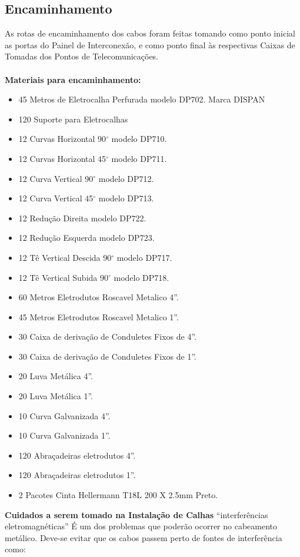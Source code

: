 \documentclass[	DIV=calc,%
							paper=a4,%
							fontsize=12pt,%
							onecolumn]{scrartcl}	 					%
\begin{document}
\subsection{Encaminhamento}
As rotas de encaminhamento dos cabos foram feitas tomando como ponto inicial as portas do Painel de Interconexão, e como ponto final às respectivas Caixas de Tomadas dos Pontos de Telecomunicações.
\\
\\
\textbf{Materiais para encaminhamento:} 
\begin{itemize}	
	\item 45 Metros de Eletrocalha Perfurada modelo DP702. Marca DISPAN
	\item 120 Suporte para Eletrocalhas
	\item 12 Curvas Horizontal 90$^\circ$ modelo DP710.
	\item 12 Curvas Horizontal 45$^\circ$  modelo DP711.
	\item 12 Curva Vertical 90$^\circ$ modelo DP712.
	\item 12 Curva Vertical 45$^\circ$  modelo DP713.
	\item 12 Redução Direita modelo DP722.
	\item 12 Redução Esquerda modelo DP723.
	\item 12 Tê Vertical Descida 90$^\circ$ modelo DP717.
	\item 12 Tê Vertical Subida 90$^\circ$ modelo DP718.
	\item 60 Metros Eletrodutos  Roscavel Metalico  4”.
	\item 45 Metros Eletrodutos  Roscavel Metalico  1”.
	\item 30 Caixa de derivação de Conduletes Fixos de 4”.
	\item 30 Caixa de derivação de Conduletes Fixos de 1”.
	\item 20 Luva Metálica 4”.
	\item 20 Luva Metálica 1”.
	\item 10 Curva Galvanizada 4”.
	\item 10 Curva Galvanizada 1”.
	\item 120 Abraçadeiras eletrodutos 4”.
	\item 120 Abraçadeiras eletrodutos 1”.
	\item 2 Pacotes Cinta Hellermann T18L 200 X 2.5mm Preto.
\end{itemize}
\textbf{Cuidados a serem tomado na Instalação de Calhas}  “interferências eletromagnéticas”
É um dos problemas que poderão ocorrer no cabeamento metálico. Deve-se evitar que os cabos passem perto de fontes de interferência como: 
\end{document}
